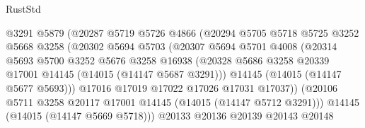 \begin{lexlean}{RustStd}
\begin{coremodule}
                                @3291
                                @5879
                                (@20287
                                  @5719
                                  @5726
                                  @4866
                                  (@20294
                                    @5705
                                    @5718
                                    @5725
                                    @3252
                                    @5668
                                    @3258
                                    (@20302
                                      @5694
                                      @5703
                                      (@20307
                                        @5694
                                        @5701
                                        @4008
                                        (@20314
                                          @5693
                                          @5700
                                          @3252
                                          @5676
                                          @3258
                                          @16938
                                          (@20328
                                            @5686
                                            @3258
                                            @20339
                                            @17001
                                            @14145
                                            (@14015 (@14147 @5687 @3291)))
                                          @14145
                                          (@14015 (@14147 @5677 @5693)))
                                        @17016
                                        @17019
                                        @17022
                                        @17026
                                        @17031
                                        @17037))
                                    (@20106
                                      @5711
                                      @3258
                                      @20117
                                      @17001
                                      @14145
                                      (@14015 (@14147 @5712 @3291)))
                                    @14145
                                    (@14015 (@14147 @5669 @5718)))
                                  @20133
                                  @20136
                                  @20139
                                  @20143
                                  @20148

\end{coremodule}
\end{lexlean}
